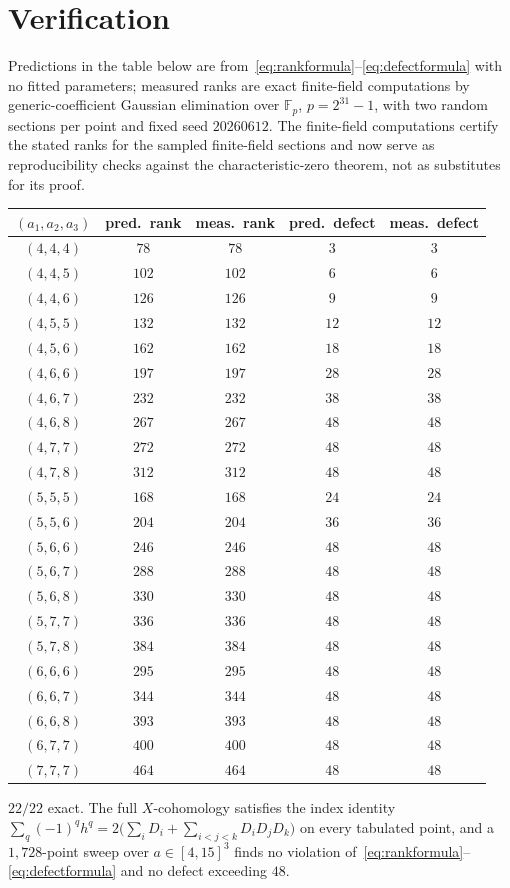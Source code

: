 \documentclass[11pt]{article}
\theoremstyle{plain}
\theoremstyle{definition}
\theoremstyle{remark}
\begin{document}
\section{Verification}\label{sec:table}

Predictions in the table below are from~\eqref{eq:rankformula}--\eqref{eq:defectformula} with no fitted parameters; measured ranks are exact finite-field computations by generic-coefficient Gaussian elimination over $\mathbb{F}_p$, $p=2^{31}-1$, with two random sections per point and fixed seed $20260612$.  The finite-field computations certify the stated ranks for the sampled finite-field sections and now serve as reproducibility checks against the characteristic-zero theorem, not as substitutes for its proof.

\begin{center}
\renewcommand{\arraystretch}{1.12}
\begin{tabular}{c c c c c}
\toprule
$(a_1,a_2,a_3)$ & pred.\ rank & meas.\ rank & pred.\ defect & meas.\ defect\\
\midrule
$(4,4,4)$ & $78$ & $78$ & $3$ & $3$\\
$(4,4,5)$ & $102$ & $102$ & $6$ & $6$\\
$(4,4,6)$ & $126$ & $126$ & $9$ & $9$\\
$(4,5,5)$ & $132$ & $132$ & $12$ & $12$\\
$(4,5,6)$ & $162$ & $162$ & $18$ & $18$\\
$(4,6,6)$ & $197$ & $197$ & $28$ & $28$\\
$(4,6,7)$ & $232$ & $232$ & $38$ & $38$\\
$(4,6,8)$ & $267$ & $267$ & $48$ & $48$\\
$(4,7,7)$ & $272$ & $272$ & $48$ & $48$\\
$(4,7,8)$ & $312$ & $312$ & $48$ & $48$\\
$(5,5,5)$ & $168$ & $168$ & $24$ & $24$\\
$(5,5,6)$ & $204$ & $204$ & $36$ & $36$\\
$(5,6,6)$ & $246$ & $246$ & $48$ & $48$\\
$(5,6,7)$ & $288$ & $288$ & $48$ & $48$\\
$(5,6,8)$ & $330$ & $330$ & $48$ & $48$\\
$(5,7,7)$ & $336$ & $336$ & $48$ & $48$\\
$(5,7,8)$ & $384$ & $384$ & $48$ & $48$\\
$(6,6,6)$ & $295$ & $295$ & $48$ & $48$\\
$(6,6,7)$ & $344$ & $344$ & $48$ & $48$\\
$(6,6,8)$ & $393$ & $393$ & $48$ & $48$\\
$(6,7,7)$ & $400$ & $400$ & $48$ & $48$\\
$(7,7,7)$ & $464$ & $464$ & $48$ & $48$\\
\bottomrule
\end{tabular}
\end{center}
\noindent
$22/22$ exact. The full $X$-cohomology satisfies the index identity $\sum_q(-1)^q h^q=2\big(\sum_iD_i+\sum_{i<j<k}D_iD_jD_k\big)$ on every tabulated point, and a $1{,}728$-point sweep over $a\in[4,15]^3$ finds no violation of~\eqref{eq:rankformula}--\eqref{eq:defectformula} and no defect exceeding $48$.
\end{document}
